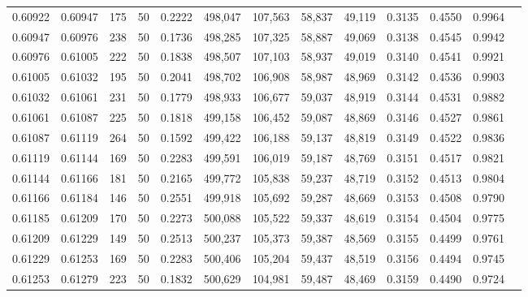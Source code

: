 \begin{tabular}{rrrrrrrrrrrrr}
0.60922 & 0.60947 &   175 &  50 &                                     0.2222 & 498,047 & 107,563 &  58,837 &  49,119 & 0.3135 & 0.4550 & 0.9964 \\
0.60947 & 0.60976 &   238 &  50 &                                     0.1736 & 498,285 & 107,325 &  58,887 &  49,069 & 0.3138 & 0.4545 & 0.9942 \\
0.60976 & 0.61005 &   222 &  50 &                                     0.1838 & 498,507 & 107,103 &  58,937 &  49,019 & 0.3140 & 0.4541 & 0.9921 \\
0.61005 & 0.61032 &   195 &  50 &                                     0.2041 & 498,702 & 106,908 &  58,987 &  48,969 & 0.3142 & 0.4536 & 0.9903 \\
0.61032 & 0.61061 &   231 &  50 &                                     0.1779 & 498,933 & 106,677 &  59,037 &  48,919 & 0.3144 & 0.4531 & 0.9882 \\
0.61061 & 0.61087 &   225 &  50 &                                     0.1818 & 499,158 & 106,452 &  59,087 &  48,869 & 0.3146 & 0.4527 & 0.9861 \\
0.61087 & 0.61119 &   264 &  50 &                                     0.1592 & 499,422 & 106,188 &  59,137 &  48,819 & 0.3149 & 0.4522 & 0.9836 \\
0.61119 & 0.61144 &   169 &  50 &                                     0.2283 & 499,591 & 106,019 &  59,187 &  48,769 & 0.3151 & 0.4517 & 0.9821 \\
0.61144 & 0.61166 &   181 &  50 &                                     0.2165 & 499,772 & 105,838 &  59,237 &  48,719 & 0.3152 & 0.4513 & 0.9804 \\
0.61166 & 0.61184 &   146 &  50 &                                     0.2551 & 499,918 & 105,692 &  59,287 &  48,669 & 0.3153 & 0.4508 & 0.9790 \\
0.61185 & 0.61209 &   170 &  50 &                                     0.2273 & 500,088 & 105,522 &  59,337 &  48,619 & 0.3154 & 0.4504 & 0.9775 \\
0.61209 & 0.61229 &   149 &  50 &                                     0.2513 & 500,237 & 105,373 &  59,387 &  48,569 & 0.3155 & 0.4499 & 0.9761 \\
0.61229 & 0.61253 &   169 &  50 &                                     0.2283 & 500,406 & 105,204 &  59,437 &  48,519 & 0.3156 & 0.4494 & 0.9745 \\
0.61253 & 0.61279 &   223 &  50 &                                     0.1832 & 500,629 & 104,981 &  59,487 &  48,469 & 0.3159 & 0.4490 & 0.9724 \\

\end{tabular}
